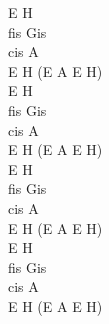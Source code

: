 \documentclass[a5paper, 10pt]{book}
\begin{document}
\begin{minipage}[t]{0.2\textwidth}
E H\\
fis Gis\\
cis A\\
E H (E A E H)\\

E H\\
fis Gis\\
cis A\\
E H (E A E H)\\

E H\\
fis Gis\\
cis A\\
E H (E A E H)\\

E H\\
fis Gis\\
cis A\\
E H (E A E H)\\
\end{minipage}

\newpage
\end{document}
